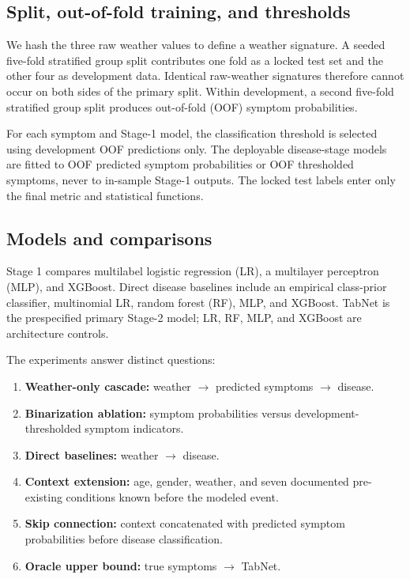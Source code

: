 \documentclass[conference]{IEEEtran}
\begin{document}
\subsection{Split, out-of-fold training, and thresholds}

We hash the three raw weather values to define a weather signature. A seeded
five-fold stratified group split contributes one fold as a locked test set and
the other four as development data. Identical raw-weather signatures therefore
cannot occur on both sides of the primary split. Within development, a second
five-fold stratified group split produces out-of-fold (OOF) symptom
probabilities.

For each symptom and Stage-1 model, the classification threshold is selected
using development OOF predictions only. The deployable disease-stage models
are fitted to OOF predicted symptom probabilities or OOF thresholded symptoms,
never to in-sample Stage-1 outputs. The locked test labels enter only the final
metric and statistical functions.

\subsection{Models and comparisons}

Stage 1 compares multilabel logistic regression (LR), a multilayer perceptron
(MLP), and XGBoost. Direct disease baselines include an empirical class-prior
classifier, multinomial LR, random forest (RF), MLP, and XGBoost. TabNet is the
prespecified primary Stage-2 model; LR, RF, MLP, and XGBoost are architecture
controls.

The experiments answer distinct questions:

\begin{enumerate}
    \item \textbf{Weather-only cascade:} weather $\rightarrow$ predicted
    symptoms $\rightarrow$ disease.
    \item \textbf{Binarization ablation:} symptom probabilities versus
    development-thresholded symptom indicators.
    \item \textbf{Direct baselines:} weather $\rightarrow$ disease.
    \item \textbf{Context extension:} age, gender, weather, and seven
    documented pre-existing conditions known before the modeled event.
    \item \textbf{Skip connection:} context concatenated with predicted
    symptom probabilities before disease classification.
    \item \textbf{Oracle upper bound:} true symptoms $\rightarrow$ TabNet.
\end{enumerate}
\end{document}
